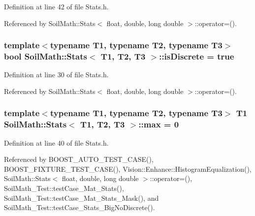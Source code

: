 Definition at line 42 of file Stats.\+h.



Referenced by Soil\+Math\+::\+Stats$<$ float, double, long double $>$\+::operator=().

\hypertarget{class_soil_math_1_1_stats_a2f54bbc8d815345b23ebbd4ba2b302bf}{}
\subsubsection[{is\+Discrete}]{\setlength{\rightskip}{0pt plus 5cm}template$<$typename T1, typename T2, typename T3$>$ bool {\bf Soil\+Math\+::\+Stats}$<$ T1, T2, T3 $>$\+::is\+Discrete = true}\label{class_soil_math_1_1_stats_a2f54bbc8d815345b23ebbd4ba2b302bf}


Definition at line 30 of file Stats.\+h.



Referenced by Soil\+Math\+::\+Stats$<$ float, double, long double $>$\+::operator=().

\hypertarget{class_soil_math_1_1_stats_ad49ee1f533564ec587cf98a094b8c564}{}
\subsubsection[{max}]{\setlength{\rightskip}{0pt plus 5cm}template$<$typename T1, typename T2, typename T3$>$ T1 {\bf Soil\+Math\+::\+Stats}$<$ T1, T2, T3 $>$\+::max = 0}\label{class_soil_math_1_1_stats_ad49ee1f533564ec587cf98a094b8c564}


Definition at line 40 of file Stats.\+h.



Referenced by B\+O\+O\+S\+T\+\_\+\+A\+U\+T\+O\+\_\+\+T\+E\+S\+T\+\_\+\+C\+A\+S\+E(), B\+O\+O\+S\+T\+\_\+\+F\+I\+X\+T\+U\+R\+E\+\_\+\+T\+E\+S\+T\+\_\+\+C\+A\+S\+E(), Vision\+::\+Enhance\+::\+Histogram\+Equalization(), Soil\+Math\+::\+Stats$<$ float, double, long double $>$\+::operator=(), Soil\+Math\+\_\+\+Test\+::test\+Case\+\_\+\+Mat\+\_\+\+Stats(), Soil\+Math\+\_\+\+Test\+::test\+Case\+\_\+\+Mat\+\_\+\+Stats\+\_\+\+Mask(), and Soil\+Math\+\_\+\+Test\+::test\+Case\+\_\+\+Stats\+\_\+\+Big\+No\+Discrete().

\hypertarget{class_soil_math_1_1_stats_a6f53982d52cf492ddd4df9b56bd014e7}{}
